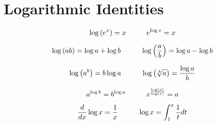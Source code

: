 \documentclass[12pt]{article}
\begin{document}
\section*{Logarithmic Identities}

\begin{equation*}
\log{\left( e^x \right)} = x \hspace{10mm} e^{\log{x}} = x
\end{equation*}

\begin{equation*}
\log{\left(  ab \right)} = \log a + \log b \hspace{10mm}  \log{\left(\frac{a}{b} \right)} = \log a - \log b
\end{equation*}

\begin{equation*}
\log{\left(  a^b \right)} = b\log a \hspace{10mm}  \log{\left(\sqrt[b]{a} \right)} = \frac{\log{a}}{b}
\end{equation*}

\begin{equation*}
a^{\log{b}} = b^{\log{a}}  \hspace{10mm}  x^{\frac{\log(a)}{\log(x)}} = a
\end{equation*}

\begin{equation*}
{d \over dx} \log x = {1 \over x } \hspace{10mm} \log x = \int_1^x \frac {1}{t} dt
\end{equation*}
\end{document}
